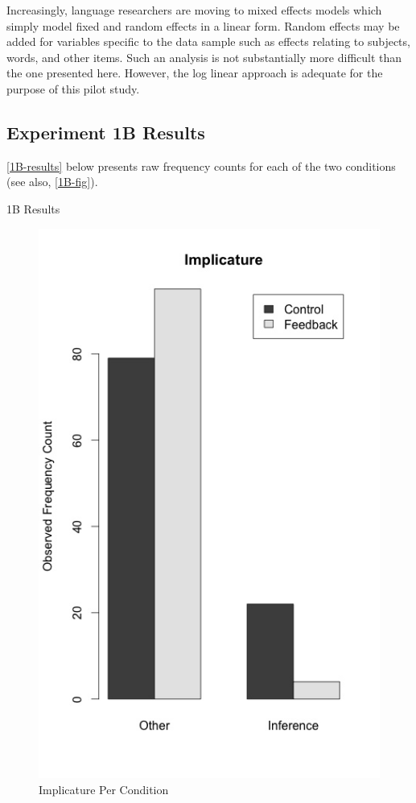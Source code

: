 Increasingly, language researchers are moving to mixed effects models which simply model fixed and random effects in a linear form. Random effects may be added for variables specific to the data sample such as effects relating to subjects, words, and other items. Such an analysis is not substantially more difficult than the one presented here. However, the log linear approach is adequate for the purpose of this pilot study.

\subsection{Experiment 1B Results}
\label{experiment1bresults}

 \autoref{1B-results}  below presents raw frequency counts for each of the two conditions (see also,  \autoref{1B-fig}). 


\begin{table}
\caption{1B Results}
\centering

\label{1B-results}
\end{table}





\begin{figure}
\centerline{
  \includegraphics[scale=.5]{chapter5.tex/implicature}
  }
\caption{Implicature Per Condition}
\label{1B-fig}
\end{figure}


